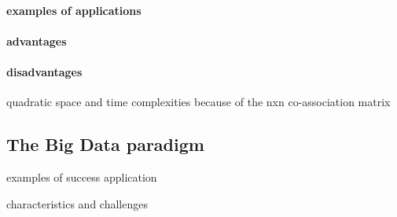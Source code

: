 \paragraph{examples of applications}

\paragraph{advantages}

\paragraph{disadvantages}
quadratic space and time complexities because of the nxn co-association matrix 


\subsection{The Big Data paradigm}
\label{sec:bigdata}

examples of success application

characteristics and challenges

